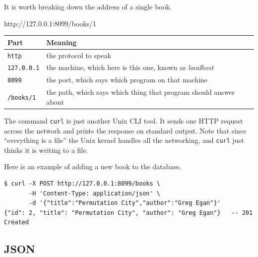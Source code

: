 \documentclass[11pt,a4paper]{article}
\begin{document}
It is worth breaking down the address of a single book.

\begin{center}
\colorbox{codebg}{\begin{minipage}{0.95\linewidth}\centering\ttfamily\small
\setlength{\fboxsep}{1.5pt}\vspace{1.6mm}
\mbox{\colorbox{linebg}{http}://\colorbox{hdrbg}{127.0.0.1}:\colorbox{bdybg}{8099}\colorbox{pathbg}{/books/1}}
\vspace{1.6mm}
\end{minipage}}
\end{center}

\begin{center}\small
\begin{tabular}{@{}ll@{}}
\toprule
\textbf{Part} & \textbf{Meaning} \\
\midrule
\colorbox{linebg}{\texttt{http}}      & the protocol to speak \\
\colorbox{hdrbg}{\texttt{127.0.0.1}}  & the machine, which here is this one, known as \emph{localhost} \\
\colorbox{bdybg}{\texttt{8099}}       & the port, which says which program on that machine \\
\colorbox{pathbg}{\texttt{/books/1}}  & the path, which says which thing that program should answer about \\
\bottomrule
\end{tabular}
\end{center}

The command \texttt{curl} is just another Unix CLI tool. It sends one HTTP request across the
network and prints the response on standard output. Note that since ``everything is a file'' the
Unix kernel handles all the networking, and \texttt{curl} just thinks it is writing to a file.

Here is an example of adding a new book to the database.

\begin{lstlisting}[language=SH]
$ curl -X POST http://127.0.0.1:8099/books \
       -H 'Content-Type: application/json' \
       -d '{"title":"Permutation City","author":"Greg Egan"}'
{"id": 2, "title": "Permutation City", "author": "Greg Egan"}   -- 201 Created
\end{lstlisting}

\subsection{JSON}
\end{document}
